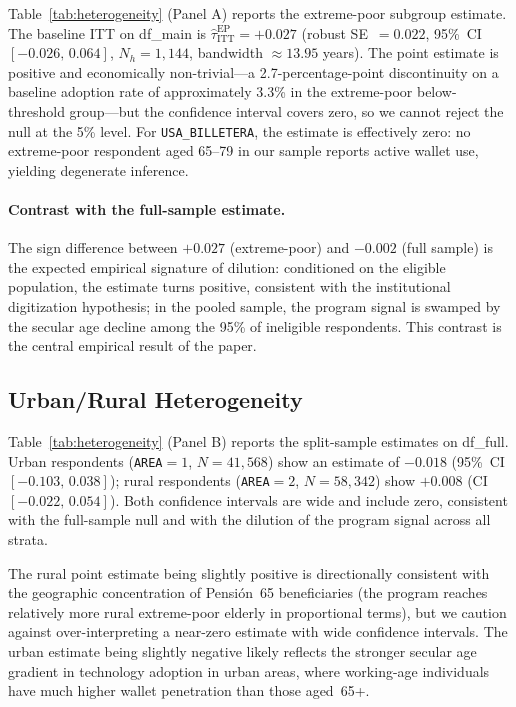 \documentclass[12pt]{article}
\begin{document}
Table~\ref{tab:heterogeneity} (Panel A) reports the extreme-poor subgroup
estimate. The baseline ITT on df\_main is
$\hat{\tau}_{\text{ITT}}^{\text{EP}} = +0.027$ (robust SE~$=0.022$,
95\%~CI $[-0.026,\,0.064]$, $N_h\!=\!1{,}144$, bandwidth $\approx\!13.95$
years). The point estimate is positive and economically non-trivial---a
2.7-percentage-point discontinuity on a baseline adoption rate of
approximately 3.3\% in the extreme-poor below-threshold group---but the
confidence interval covers zero, so we cannot reject the null at the 5\%
level. For \texttt{USA\_BILLETERA}, the estimate is effectively zero:
no extreme-poor respondent aged 65--79 in our sample reports active wallet
use, yielding degenerate inference.

\paragraph{Contrast with the full-sample estimate.}
The sign difference between $+0.027$ (extreme-poor) and $-0.002$ (full
sample) is the expected empirical signature of dilution: conditioned on the
eligible population, the estimate turns positive, consistent with the
institutional digitization hypothesis; in the pooled sample, the program
signal is swamped by the secular age decline among the 95\% of ineligible
respondents. This contrast is the central empirical result of the paper.

\subsection{Urban/Rural Heterogeneity}
\label{subsec:area_het}

Table~\ref{tab:heterogeneity} (Panel B) reports the split-sample estimates
on df\_full. Urban respondents (\texttt{AREA}$=1$, $N=41{,}568$) show an
estimate of $-0.018$ (95\%~CI $[-0.103,\,0.038]$); rural respondents
(\texttt{AREA}$=2$, $N=58{,}342$) show $+0.008$ (CI $[-0.022,\,0.054]$).
Both confidence intervals are wide and include zero, consistent with the
full-sample null and with the dilution of the program signal across all
strata.

The rural point estimate being slightly positive is directionally consistent
with the geographic concentration of Pensi\'on~65 beneficiaries (the
program reaches relatively more rural extreme-poor elderly in proportional
terms), but we caution against over-interpreting a near-zero estimate with
wide confidence intervals. The urban estimate being slightly negative likely
reflects the stronger secular age gradient in technology adoption in urban
areas, where working-age individuals have much higher wallet penetration than
those aged~65+.
\end{document}
